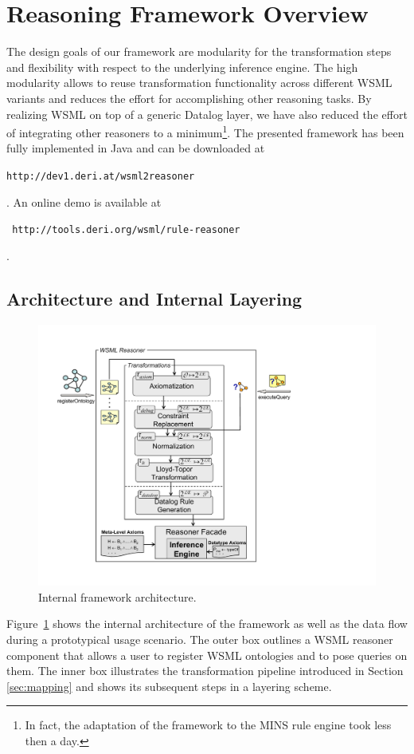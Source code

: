 \section{Reasoning Framework Overview\vspace{-1.5mm}\label{sec:framework}}
The design goals of our framework are modularity for the
transformation steps and flexibility with respect to the
underlying inference engine. The high modularity allows to reuse
transformation functionality across different WSML variants and
reduces the effort for accomplishing other reasoning tasks. By
realizing WSML on top of a generic Datalog layer, we have also
reduced the effort of integrating other reasoners to a
minimum\footnote{In fact, the adaptation of the framework to the
MINS rule engine took less then a day.}. The presented framework
has been fully implemented in Java and can be downloaded at
\begin{small}{\tt http://dev1.deri.at/wsml2reasoner}\end{small}.
An online demo is available at \begin{small}{\tt
http://tools.deri.org/wsml/rule-reasoner}\end{small}.

\subsection{Architecture and Internal Layering}
\begin{figure}[tb]
    \includegraphics[width=12.6cm]{figures/layering}
    \centering
    \vspace{-5mm}\caption{Internal framework architecture. \label{fig:layering}}
\end{figure}
Figure~\ref{fig:layering} shows the internal architecture of the
framework as well as the data flow during a prototypical usage
scenario. The outer box outlines a WSML reasoner component that
allows a user to register WSML ontologies and to pose queries on
them. The inner box illustrates the transformation pipeline
introduced in Section \ref{sec:mapping} and shows its subsequent
steps in a layering scheme.

